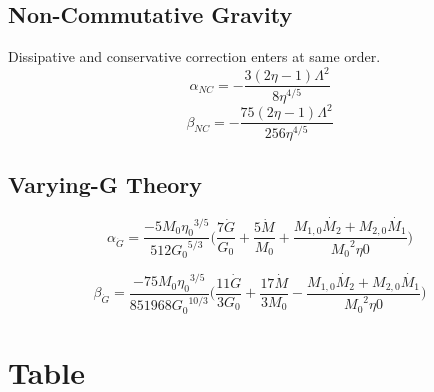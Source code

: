 \documentclass[11pt]{article}
\begin{document}
 \subsection{Non-Commutative Gravity}
 Dissipative and conservative correction enters at same order. \cite{Kobakhidze:2016cqh}
 \begin{equation}
 \alpha_{NC}=-\frac{3 (2 \eta -1) \Lambda ^2}{8 \eta ^{4/5}}
 \end{equation}
 \begin{equation}
 \beta_{NC}=-\frac{75 (2 \eta -1) \Lambda ^2}{256 \eta ^{4/5}}
 \end{equation}
 \newpage
 
 \subsection{Varying-G Theory}
 \begin{equation}
 \alpha_{\dot{G}}=\frac{-5 M_0 {\eta_0}^{3/5}}{512 {G_0}^{5/3}} \bigg(\frac{7 \dot{G}}{ G_0} + \frac{5\dot{M}}{M_0}+\frac{M_{1,0}\dot{M_2}+M_{2,0}\dot{M_1}}{{M_0}^2 \eta0}\bigg)
 \end{equation}
 
 
 \begin{equation}
 \beta_{\dot{G}}=\frac{-75 M_0 {\eta_0}^{3/5}}{851968 {G_0}^{10/3}} \bigg(\frac{11 \dot{G}}{3 G_0} + \frac{17 \dot{M}}{3M_0}-\frac{M_{1,0}\dot{M_2}+M_{2,0}\dot{M_1}}{{M_0}^2 \eta0}\bigg)
  \end{equation}
 

 

 
 
 
 \section{Table}
\end{document}

